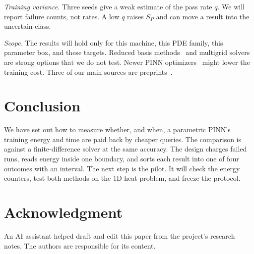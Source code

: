 \documentclass[conference]{IEEEtran}
\begin{document}
\emph{Training variance.} Three seeds give a weak estimate of the pass rate $q$. We will report failure counts, not rates. A low $q$ raises $S_P$ and can move a result into the uncertain class.

\emph{Scope.} The results will hold only for this machine, this PDE family, this parameter box, and these targets. Reduced basis methods~\cite{hesthaven2016} and multigrid solvers are strong options that we do not test. Newer PINN optimizers~\cite{wang2025soap} might lower the training cost. Three of our main sources are preprints~\cite{huang2026review,zhang2026,kapoor2025}.

\section{Conclusion}\label{sec:conclusion}

We have set out how to measure whether, and when, a parametric PINN's training energy and time are paid back by cheaper queries. The comparison is against a finite-difference solver at the same accuracy. The design charges failed runs, reads energy inside one boundary, and sorts each result into one of four outcomes with an interval. The next step is the pilot. It will check the energy counters, test both methods on the 1D heat problem, and freeze the protocol.

\section*{Acknowledgment}
An AI assistant helped draft and edit this paper from the project's research notes. The authors are responsible for its content.



\end{document}
